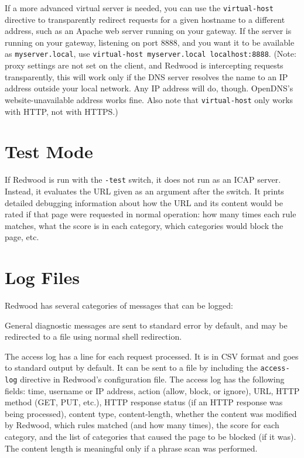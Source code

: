 \documentclass{article}
\begin{document}
If a more advanced virtual server is needed, you can use the \verb"virtual-host"
directive to transparently redirect requests for a given hostname to a different address,
such as an Apache web server running on your gateway.
If the server is running on your gateway, listening on port 8888, and you want it to be 
available as \verb"myserver.local", use \verb"virtual-host myserver.local localhost:8888".
(Note: proxy settings are not set on the client, and Redwood is intercepting
requests transparently, this will work only if the DNS server resolves the name
to an IP address outside your local network. 
Any IP address will do, though. OpenDNS's website-unavailable address works fine.
Also note that \verb"virtual-host" only works with HTTP, not with HTTPS.)

\section{Test Mode}

If Redwood is run with the \verb"-test" switch, it does not run as an ICAP server. 
Instead, it evaluates the URL given as an argument after the switch.
It prints detailed debugging information about how the URL and its content would be rated
if that page were requested in normal operation: how many times each rule matches, 
what the score is in each category, which categories would block the page, etc.

\section{Log Files}

Redwood has several categories of messages that can be logged:

General diagnostic messages are sent to standard error by default,
and may be redirected to a file using normal shell redirection.

The access log has a line for each request processed.
It is in CSV format
and goes to standard output by default.
It can be sent to a file by including the \verb"access-log" directive in Redwood's configuration file.
The access log has the following fields: time, username or IP address, 
action (allow, block, or ignore), URL, HTTP method (GET, PUT, etc.),
HTTP response status (if an HTTP response was being processed), 
content type, content-length, whether the content was modified by Redwood, which rules matched (and how many times), 
the score for each category, and the list of categories that caused the page to be blocked (if it was).
The content length is meaningful only if a phrase scan was performed.
\end{document}
